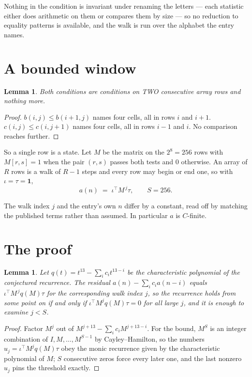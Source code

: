 \documentclass[11pt,a4paper]{article}
\theoremstyle{plain}
\newtheorem{lemma}[theorem]{Lemma}
\theoremstyle{definition}
\begin{document}
Nothing in the condition is invariant under renaming the letters --- each statistic either does
arithmetic on them or compares them by size --- so no reduction to equality patterns is
available, and the walk is run over the alphabet the entry names.

\section{A bounded window}

\begin{lemma}\label{lem:win}
Both conditions are conditions on TWO consecutive array rows and nothing more.
\end{lemma}

\begin{proof}
$b(i,j)\le b(i{+}1,j)$ names four cells, all in rows $i$ and $i+1$. $c(i,j)\le c(i,j{+}1)$
names four cells, all in rows $i-1$ and $i$. No comparison reaches further.
\end{proof}

So a single row is a state. Let $M$ be the matrix on the $2^{8}=256$ rows with
$M[r,s]=1$ when the pair $(r,s)$ passes both tests and $0$ otherwise. An array of $R$ rows is a
walk of $R-1$ steps and every row may begin or end one, so with $\iota=\tau=\mathbf{1}$,
\[
a(n)\;=\;\iota^{\!\top}M^{\,j}\tau ,\qquad S=256.
\]

The walk index $j$ and the entry's own $n$ differ by a constant, read off by matching the
published terms rather than assumed. In particular $a$ is $C$-finite.

\section{The proof}

\begin{lemma}\label{lem:crit}
Let $q(t)=t^{13}-\sum_i c_it^{13-i}$ be the characteristic polynomial of the
conjectured recurrence. The residual $a(n)-\sum_ic_ia(n-i)$ equals
$\iota^{\!\top}M^{\,j}q(M)\tau$ for the corresponding walk index $j$, so the recurrence
holds from some point on if and only if $\iota^{\!\top}M^{j}q(M)\tau=0$ for all large $j$,
and it is enough to examine $j<S$.
\end{lemma}

\begin{proof}
Factor $M^{j}$ out of $M^{j+13}-\sum_ic_iM^{j+13-i}$. For the bound, $M^{S}$
is an integer combination of $I,M,\dots,M^{S-1}$ by Cayley--Hamilton, so the numbers
$u_j=\iota^{\!\top}M^{j}q(M)\tau$ obey the monic recurrence given by the characteristic
polynomial of $M$; $S$ consecutive zeros force every later one, and the last nonzero $u_j$
pins the threshold exactly.
\end{proof}
\end{document}
